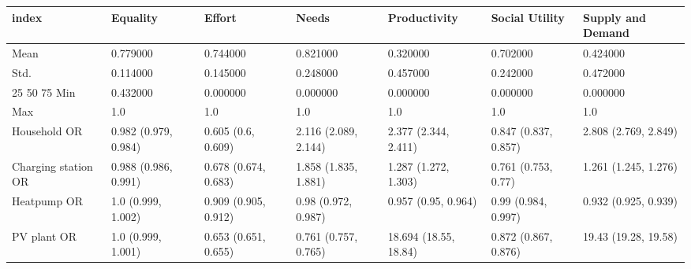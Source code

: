 \begin{tabular}{lllllll}
\toprule
index & Equality & Effort & Needs & Productivity & Social Utility & Supply and Demand \\
\midrule
Mean & 0.779000 & 0.744000 & 0.821000 & 0.320000 & 0.702000 & 0.424000 \\
Std. & 0.114000 & 0.145000 & 0.248000 & 0.457000 & 0.242000 & 0.472000 \\
25%
50%
75%
Min & 0.432000 & 0.000000 & 0.000000 & 0.000000 & 0.000000 & 0.000000 \\
Max & 1.0 & 1.0 & 1.0 & 1.0 & 1.0 & 1.0 \\
Household OR & 0.982 (0.979, 0.984) & 0.605 (0.6, 0.609) & 2.116 (2.089, 2.144) & 2.377 (2.344, 2.411) & 0.847 (0.837, 0.857) & 2.808 (2.769, 2.849) \\
Charging station OR & 0.988 (0.986, 0.991) & 0.678 (0.674, 0.683) & 1.858 (1.835, 1.881) & 1.287 (1.272, 1.303) & 0.761 (0.753, 0.77) & 1.261 (1.245, 1.276) \\
Heatpump OR & 1.0 (0.999, 1.002) & 0.909 (0.905, 0.912) & 0.98 (0.972, 0.987) & 0.957 (0.95, 0.964) & 0.99 (0.984, 0.997) & 0.932 (0.925, 0.939) \\
PV plant OR & 1.0 (0.999, 1.001) & 0.653 (0.651, 0.655) & 0.761 (0.757, 0.765) & 18.694 (18.55, 18.84) & 0.872 (0.867, 0.876) & 19.43 (19.28, 19.58) \\
\bottomrule
\end{tabular}
